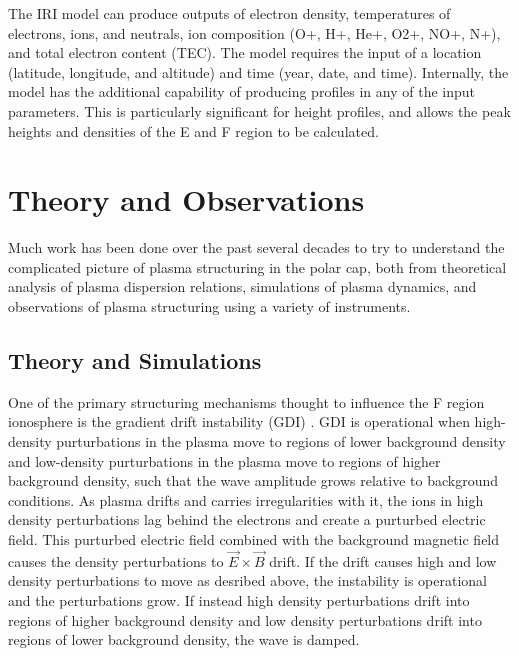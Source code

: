 The IRI model can produce outputs of electron density, temperatures of electrons, ions, and neutrals, ion composition (O+, H+, He+, O2+, NO+, N+), and total electron content (TEC).  The model requires the input of a location (latitude, longitude, and altitude) and time (year, date, and time).  Internally, the model has the additional capability of producing profiles in any of the input parameters.  This is particularly significant for height profiles, and allows the peak heights and densities of the E and F region to be calculated.


\section{Theory and Observations}
Much work has been done over the past several decades to try to understand the complicated picture of plasma structuring in the polar cap, both from theoretical analysis of plasma dispersion relations, simulations of plasma dynamics, and observations of plasma structuring using a variety of instruments.

\subsection{Theory and Simulations}
One of the primary structuring mechanisms thought to influence the F region ionosphere is the gradient drift instability (GDI) \citep{Tsunoda1988}.  GDI is operational when high-density purturbations in the plasma move to regions of lower background density and low-density purturbations in the plasma move to regions of higher background density, such that the wave amplitude grows relative to background conditions.  As plasma drifts and carries irregularities with it, the ions in high density perturbations lag behind the electrons and create a purturbed electric field.  This purturbed electric field combined with the background magnetic field causes the density perturbations to \(\vec{E}\times\vec{B}\) drift.  If the drift causes high and low density perturbations to move as desribed above, the instability is operational and the perturbations grow.  If instead high density perturbations drift into regions of higher background density and low density perturbations drift into regions of lower background density, the wave is damped.

